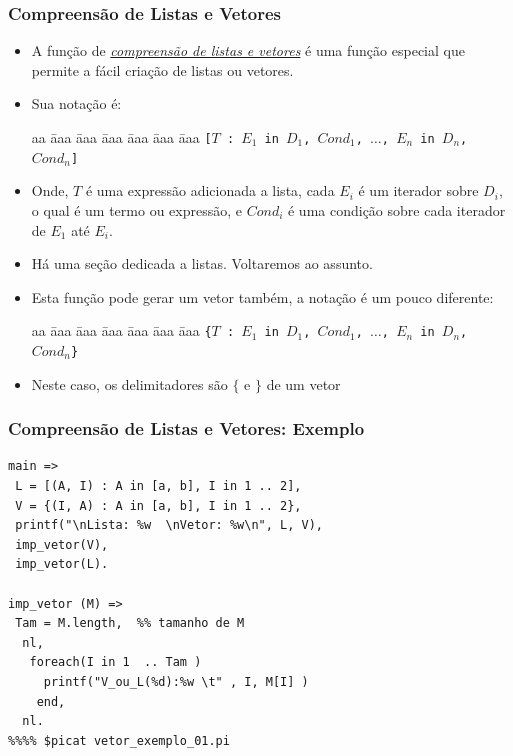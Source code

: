 \begin{frame}[c,allowframebreaks]

\frametitle{Compreensão de Listas e Vetores}    
    
\begin{itemize}    
    \item A função de \underline{\textit{compreensão de listas e vetores}} é uma 
    função especial que  permite a fácil criação de listas ou vetores.
    
    \item Sua notação é:
    
    \begin{tabbing}
        aa \= aaa \= aaa \= aaa \= aaa \= aaa \= aaa \kill
        \> \> \texttt{[$T$ : $E_1$ \texttt{in} $D_1$, $Cond_1$, $\ldots$, $E_n$ in $D_n$, $Cond_n$]} 
    \end{tabbing}
    
    \item Onde, $T$ é uma expressão  adicionada a lista, cada $E_i$ é um 
    iterador sobre $D_i$, o qual é um termo ou expressão, 
     e $Cond_i$ é uma condição sobre cada iterador de $E_1$ até $E_i$.
    
    \item Há uma seção dedicada a listas. Voltaremos ao assunto.
    
    \framebreak

    \item Esta função pode gerar um vetor também, a notação é um pouco diferente:
    
    \begin{tabbing}
        aa \= aaa \= aaa \= aaa \= aaa \= aaa \= aaa \kill
        \> \> \texttt{\{$T$ : $E_1$ \texttt{in} $D_1$, $Cond_1$, $\ldots$, $E_n$ in $D_n$, $Cond_n$\}} 
    \end{tabbing}
    
    \item Neste caso, os delimitadores são $\{$ e $\}$ de um vetor

\end{itemize}

\end{frame}      

 \begin{frame}[fragile]
 \frametitle{Compreensão de Listas e Vetores: Exemplo}
\begin{footnotesize}

\begin{verbatim}
main =>
 L = [(A, I) : A in [a, b], I in 1 .. 2],
 V = {(I, A) : A in [a, b], I in 1 .. 2},
 printf("\nLista: %w  \nVetor: %w\n", L, V),
 imp_vetor(V),
 imp_vetor(L).

imp_vetor (M) => 
 Tam = M.length,  %% tamanho de M
  nl,
   foreach(I in 1  .. Tam )
     printf("V_ou_L(%d):%w \t" , I, M[I] )
    end,
  nl.
%%%% $picat vetor_exemplo_01.pi
\end{verbatim}
\end{footnotesize}
 
\end{frame}

